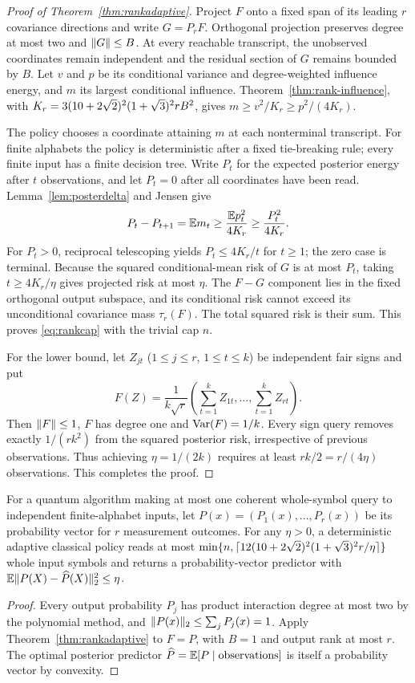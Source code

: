 \begin{proof}[Proof of Theorem~\ref{thm:rankadaptive}]
Project $F$ onto a fixed span of its leading $r$ covariance directions and write $G=P_rF$. Orthogonal projection preserves degree at most two and $\lVert G\rVert\le B$. At every reachable transcript, the unobserved coordinates remain independent and the residual section of $G$ remains bounded by $B$. Let $v$ and $p$ be its conditional variance and degree-weighted influence energy, and $m$ its largest conditional influence. Theorem~\ref{thm:rank-influence}, with $K_r=3(10+2\sqrt2)^2(1+\sqrt3)^2 rB^2$, gives $m\ge v^2/K_r\ge p^2/(4K_r)$.

The policy chooses a coordinate attaining $m$ at each nonterminal transcript. For finite alphabets the policy is deterministic after a fixed tie-breaking rule; every finite input has a finite decision tree. Write $P_t$ for the expected posterior energy after $t$ observations, and let $P_t=0$ after all coordinates have been read. Lemma~\ref{lem:posterdelta} and Jensen give
\[
 P_t-P_{t+1}=\mathbb E m_t\ge\frac{\mathbb E p_t^2}{4K_r}\ge\frac{P_t^2}{4K_r}.
\]
For $P_t>0$, reciprocal telescoping yields $P_t\le4K_r/t$ for $t\ge1$; the zero case is terminal. Because the squared conditional-mean risk of $G$ is at most $P_t$, taking $t\ge4K_r/\eta$ gives projected risk at most $\eta$. The $F-G$ component lies in the fixed orthogonal output subspace, and its conditional risk cannot exceed its unconditional covariance mass $\tau_r(F)$. The total squared risk is their sum. This proves \eqref{eq:rankcap} with the trivial cap $n$.

For the lower bound, let $Z_{jt}$ ($1\le j\le r$, $1\le t\le k$) be independent fair signs and put
\[
 F(Z)=\frac1{k\sqrt r}\left(\sum_{t=1}^kZ_{1t},\ldots,\sum_{t=1}^kZ_{rt}\right).
\]
Then $\lVert F\rVert\le1$, $F$ has degree one and $\operatorname{Var}(F)=1/k$. Every sign query removes exactly $1/(rk^2)$ from the squared posterior risk, irrespective of previous observations. Thus achieving $\eta=1/(2k)$ requires at least $rk/2=r/(4\eta)$ observations. This completes the proof.
\end{proof}

\begin{corollary}\label{cor:outcomedistribution}
For a quantum algorithm making at most one coherent whole-symbol query to independent finite-alphabet inputs, let $P(x)=(P_1(x),\ldots,P_r(x))$ be its probability vector for $r$ measurement outcomes. For any $\eta>0$, a deterministic adaptive classical policy reads at most
$\min\{n,\lceil12(10+2\sqrt2)^2(1+\sqrt3)^2 r/\eta\rceil\}$ whole input symbols and returns a probability-vector predictor with $\mathbb E\lVert P(X)-\widehat P(X)\rVert_2^2\le\eta$.
\end{corollary}
\begin{proof}
Every output probability $P_j$ has product interaction degree at most two by the polynomial method, and $\lVert P(x)\rVert_2\le\sum_jP_j(x)=1$. Apply Theorem~\ref{thm:rankadaptive} to $F=P$, with $B=1$ and output rank at most $r$. The optimal posterior predictor $\widehat P=\mathbb E[P\mid\text{observations}]$ is itself a probability vector by convexity.
\end{proof}

